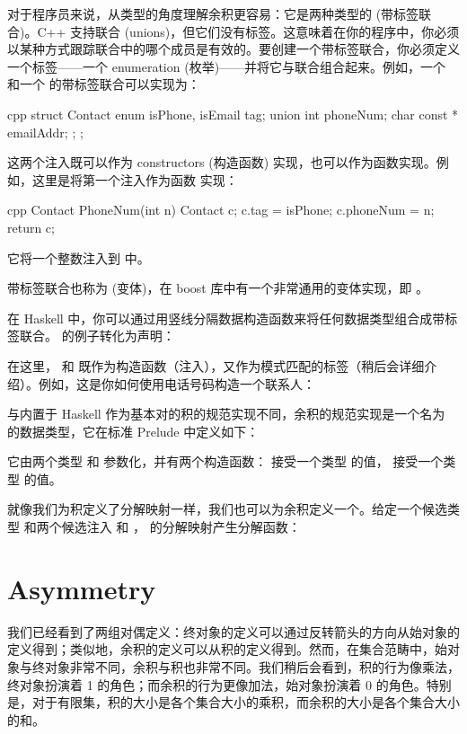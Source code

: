 对于程序员来说，从类型的角度理解余积更容易：它是两种类型的  (带标签联合)。C++ 支持联合 (unions)，但它们没有标签。这意味着在你的程序中，你必须以某种方式跟踪联合中的哪个成员是有效的。要创建一个带标签联合，你必须定义一个标签——一个 enumeration (枚举)——并将它与联合组合起来。例如，一个  和一个  的带标签联合可以实现为：

\begin{snip}{cpp}
struct Contact {
    enum { isPhone, isEmail } tag;
    union { int phoneNum; char const * emailAddr; };
};
\end{snip}
这两个注入既可以作为 constructors (构造函数) 实现，也可以作为函数实现。例如，这里是将第一个注入作为函数  实现：

\begin{snip}{cpp}
Contact PhoneNum(int n) {
    Contact c;
    c.tag = isPhone;
    c.phoneNum = n;
    return c;
}
\end{snip}
它将一个整数注入到  中。

带标签联合也称为  (变体)，在 boost 库中有一个非常通用的变体实现，即 。

在 Haskell 中，你可以通过用竖线分隔数据构造函数来将任何数据类型组合成带标签联合。 的例子转化为声明：

在这里， 和  既作为构造函数（注入），又作为模式匹配的标签（稍后会详细介绍）。例如，这是你如何使用电话号码构造一个联系人：

与内置于 Haskell 作为基本对的积的规范实现不同，余积的规范实现是一个名为  的数据类型，它在标准 Prelude 中定义如下：

它由两个类型  和  参数化，并有两个构造函数： 接受一个类型  的值， 接受一个类型  的值。

就像我们为积定义了分解映射一样，我们也可以为余积定义一个。给定一个候选类型  和两个候选注入  和 ， 的分解映射产生分解函数：


\section{Asymmetry}

我们已经看到了两组对偶定义：终对象的定义可以通过反转箭头的方向从始对象的定义得到；类似地，余积的定义可以从积的定义得到。然而，在集合范畴中，始对象与终对象非常不同，余积与积也非常不同。我们稍后会看到，积的行为像乘法，终对象扮演着 1 的角色；而余积的行为更像加法，始对象扮演着 0 的角色。特别是，对于有限集，积的大小是各个集合大小的乘积，而余积的大小是各个集合大小的和。

